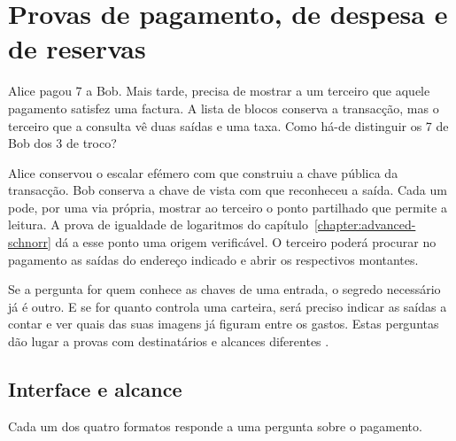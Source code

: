 \chapter{Provas de pagamento, de despesa e de reservas}
\label{chapter:tx-knowledge-proofs}

Alice pagou 7 a Bob. Mais tarde, precisa de mostrar a um terceiro
que aquele pagamento satisfez uma factura. A lista de blocos conserva
a transacção, mas o terceiro que a consulta vê duas saídas e uma taxa.
Como há-de distinguir os 7 de Bob dos 3 de troco?

Alice conservou o escalar efémero com que construiu a chave pública
da transacção. Bob conserva a chave de vista com que reconheceu a
saída. Cada um pode, por uma via própria, mostrar ao terceiro o ponto
partilhado que permite a leitura. A prova de igualdade de logaritmos
do capítulo~\ref{chapter:advanced-schnorr} dá a esse ponto uma origem
verificável. O terceiro poderá procurar no pagamento as saídas do
endereço indicado e abrir os respectivos montantes.

Se a pergunta for quem conhece as chaves de uma entrada, o segredo
necessário já é outro. E se for quanto controla uma carteira,
será preciso indicar as saídas a contar e ver quais das suas imagens
já figuram entre os gastos. Estas perguntas dão lugar a provas com
destinatários e alcances diferentes \cite{monero-source-v16}.

\section{Interface e alcance}
\label{sec:proofs-monero-proofs}

Cada um dos quatro formatos responde a uma pergunta sobre o pagamento.

